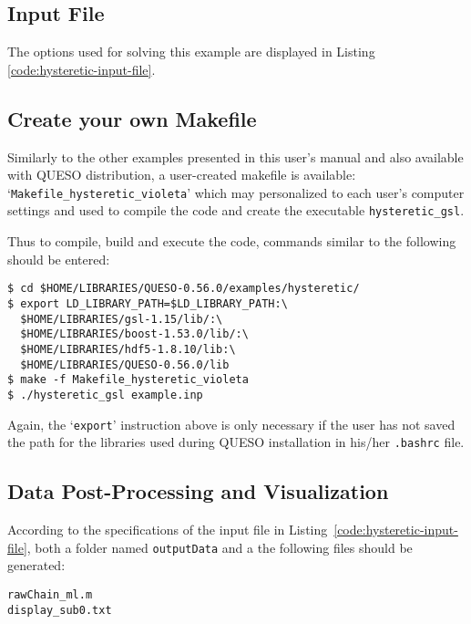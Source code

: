 \subsection{Input File}\label{sec:hysteretic-input-file}


The options used for solving this example are displayed in Listing \ref{code:hysteretic-input-file}.



\subsection{Create your own Makefile}\label{sec:hysteretic-makefile}

Similarly to the other examples presented in this user's manual and also available with QUESO distribution, a user-created makefile is available: `\texttt{Makefile\_hysteretic\_violeta}' which may personalized to each user's computer settings and used to compile the code and create the executable \verb+hysteretic_gsl+.

Thus to compile, build and execute the code,  commands similar to the following should be entered:
\begin{lstlisting}
$ cd $HOME/LIBRARIES/QUESO-0.56.0/examples/hysteretic/
$ export LD_LIBRARY_PATH=$LD_LIBRARY_PATH:\
  $HOME/LIBRARIES/gsl-1.15/lib/:\
  $HOME/LIBRARIES/boost-1.53.0/lib/:\
  $HOME/LIBRARIES/hdf5-1.8.10/lib:\
  $HOME/LIBRARIES/QUESO-0.56.0/lib
$ make -f Makefile_hysteretic_violeta
$ ./hysteretic_gsl example.inp
\end{lstlisting}

Again, the `\verb+export+' instruction above is only necessary if the user has not saved the path for the libraries used during QUESO installation in his/her \verb+.bashrc+ file.



\subsection{Data Post-Processing and Visualization}\label{sec:hysteretic-results}



According to the specifications of the input file in Listing~\ref{code:hysteretic-input-file}, both a folder named \verb+outputData+ and a the following files should be generated:
\begin{verbatim}
rawChain_ml.m
display_sub0.txt
\end{verbatim}

